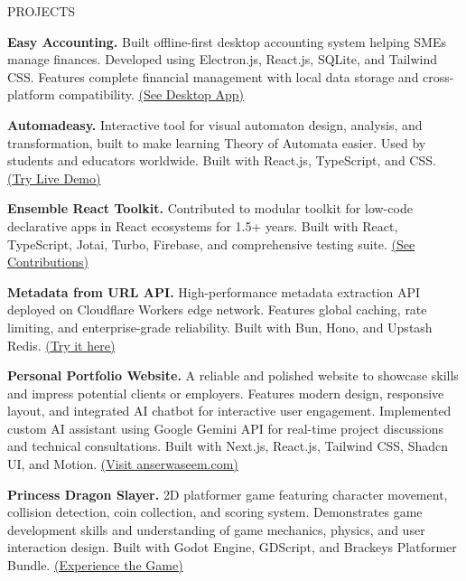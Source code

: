 \documentclass{resume} %
\begin{document}

\begin{rSection}{PROJECTS}
\vspace{-1.25em}
\item \textbf{Easy Accounting.} {Built offline-first desktop accounting system helping SMEs manage finances. Developed using Electron.js, React.js, SQLite, and Tailwind CSS. Features complete financial management with local data storage and cross-platform compatibility.
\href{https://github.com/anserwaseem/easy-accounting/releases}{(See Desktop App)}}
\item \textbf{Automadeasy.} {Interactive tool for visual automaton design, analysis, and transformation, built to make learning Theory of Automata easier. Used by students and educators worldwide. Built with React.js, TypeScript, and CSS. \href{https://www.automadeasy.com/}{(Try Live Demo)}}
\item \textbf{Ensemble React Toolkit.} {Contributed to modular toolkit for low-code declarative apps in React ecosystems for 1.5+ years. Built with React, TypeScript, Jotai, Turbo, Firebase, and comprehensive testing suite.
\href{https://github.com/EnsembleUI/ensemble-react}{(See Contributions)}}
\item \textbf{Metadata from URL API.} {High-performance metadata extraction API deployed on Cloudflare Workers edge network. Features global caching, rate limiting, and enterprise-grade reliability. Built with Bun, Hono, and Upstash Redis.
\href{https://rapidapi.com/hafizanserwaseem/api/metadata-from-url/}{(Try it here)}}
\item \textbf{Personal Portfolio Website.} {A reliable and polished website to showcase skills and impress potential clients or employers. Features modern design, responsive layout, and integrated AI chatbot for interactive user engagement. Implemented custom AI assistant using Google Gemini API for real-time project discussions and technical consultations. Built with Next.js, React.js, Tailwind CSS, Shadcn UI, and Motion. \href{https://anserwaseem.com}{(Visit anserwaseem.com)}}
\item \textbf{Princess Dragon Slayer.} {2D platformer game featuring character movement, collision detection, coin collection, and scoring system. Demonstrates game development skills and understanding of game mechanics, physics, and user interaction design. Built with Godot Engine, GDScript, and Brackeys Platformer Bundle. \href{https://github.com/anserwaseem/princess-dragon-slayer}{(Experience the Game)}}
\end{rSection} 
\end{document}
